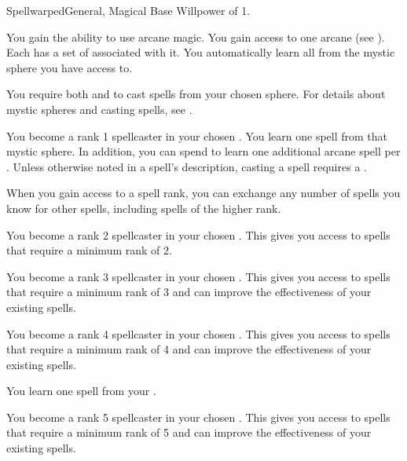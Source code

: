     \begin{feat}{Spellwarped}{General, Magical}
        \featpre Base Willpower of 1.

         You gain the ability to use arcane magic.
        You gain access to one arcane  (see ).
        Each  has a set of  associated with it.
        You automatically learn all  from the mystic sphere you have access to.

        You require both  and  to cast spells from your chosen sphere.
        For details about mystic spheres and casting spells, see .

         You become a rank 1 spellcaster in your chosen .
        You learn one spell from that mystic sphere.
        In addition, you can spend  to learn one additional arcane spell per .
        Unless otherwise noted in a spell's description, casting a spell requires a .

        When you gain access to a spell rank,
            you can exchange any number of spells you know for other spells,
            including spells of the higher rank.

         You become a rank 2 spellcaster in your chosen .
        This gives you access to spells that require a minimum rank of 2.

         You become a rank 3 spellcaster in your chosen .
        This gives you access to spells that require a minimum rank of 3 and can improve the effectiveness of your existing spells.

         You become a rank 4 spellcaster in your chosen .
        This gives you access to spells that require a minimum rank of 4 and can improve the effectiveness of your existing spells.

         You learn one spell from your .

         You become a rank 5 spellcaster in your chosen .
        This gives you access to spells that require a minimum rank of 5 and can improve the effectiveness of your existing spells.


\end{feat}
